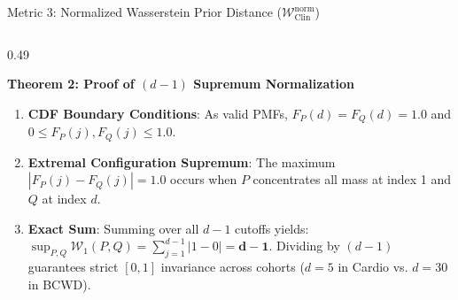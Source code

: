 \documentclass[aspectratio=169,10pt]{beamer}
\begin{document}
\begin{frame}{Metric 3: Normalized Wasserstein Prior Distance ($\mathcal{W}_{\text{Clin}}^{\text{norm}}$)}
\begin{columns}[t]
\begin{column}{0.49\textwidth}
\begin{exampleblock}{\textbf{Theorem 2: Proof of $(d - 1)$ Supremum Normalization}}
\begin{enumerate}
          $\mathcal{W}_1(P, Q) = \sum_{j=1}^{d-1} |F_P(j) - F_Q(j)|$.
          \item \textbf{CDF Boundary Conditions}: As valid PMFs, $F_P(d) = F_Q(d) = 1.0$ and $0 \le F_P(j), F_Q(j) \le 1.0$.
          \item \textbf{Extremal Configuration Supremum}: The maximum $|F_P(j) - F_Q(j)| = 1.0$ occurs when $P$ concentrates all mass at index 1 and $Q$ at index $d$.
          \item \textbf{Exact Sum}: Summing over all $d-1$ cutoffs yields:
          $\sup_{P, Q} \mathcal{W}_1(P, Q) = \sum_{j=1}^{d-1} |1 - 0| = \mathbf{d - 1}$.
          Dividing by $(d - 1)$ guarantees strict $[0, 1]$ invariance across cohorts ($d = 5$ in Cardio vs. $d = 30$ in BCWD).
        \end{enumerate}
      \end{exampleblock}
    \end{column}
  \end{columns}
\end{frame}
\end{document}
